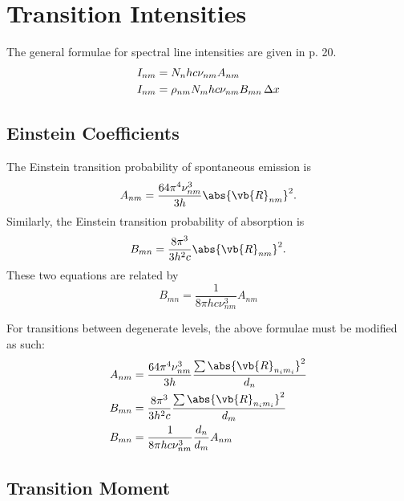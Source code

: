 \documentclass[11pt, twoside, fleqn]{report}
\begin{document}
\section{Transition Intensities}

The general formulae for spectral line intensities are given in \cite{herzbergMolecularSpectraMolecular1950} p. 20.
\begin{align*}
    I_{nm} & = N_nhc\nu_{nm}A_{nm}                  \\
    I_{nm} & = \rho_{nm}N_mhc\nu_{nm}B_{mn}\adif{x}
\end{align*}

\subsection{Einstein Coefficients}

The Einstein transition probability of spontaneous emission is
\begin{equation*}
    A_{nm} = \frac{64\pi^4\nu_{nm}^3}{3h}\abs{\vb{R}_{nm}}^2.
\end{equation*}
Similarly, the Einstein transition probability of absorption is
\begin{equation*}
    B_{mn} = \frac{8\pi^3}{3h^2c}\abs{\vb{R}_{nm}}^2.
\end{equation*}
These two equations are related by
\begin{equation*}
    B_{mn} = \frac{1}{8\pi hc\nu_{nm}^3}A_{nm}
\end{equation*}

For transitions between degenerate levels, the above formulae must be modified as such:
\begin{align*}
    A_{nm} & = \frac{64\pi^4\nu_{nm}^3}{3h}\frac{\sum\abs{\vb{R}_{n_im_i}}^2}{d_n} \\
    B_{mn} & = \frac{8\pi^3}{3h^2c}\frac{\sum\abs{\vb{R}_{n_im_i}}^2}{d_m}         \\
    B_{mn} & = \frac{1}{8\pi hc\nu_{nm}^3}\frac{d_n}{d_m}A_{nm}
\end{align*}

\subsection{Transition Moment}
\end{document}
